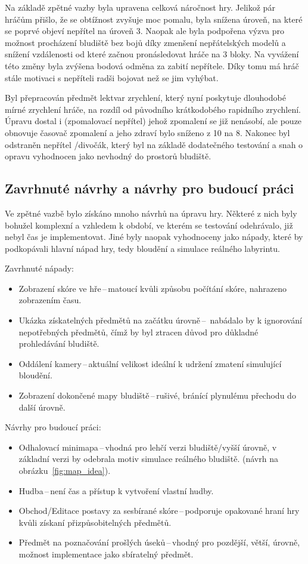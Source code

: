 Na základě zpětné vazby byla upravena celková náročnost hry. Jelikož pár hráčům přišlo, že se obtížnost zvyšuje moc pomalu, byla snížena úroveň, na které se poprvé objeví nepřítel na úroveň 3. Naopak ale byla podpořena výzva pro možnost procházení bludiště bez bojů díky zmenšení nepřátelských modelů a snížení vzdálenosti od které začnou pronásledovat hráče na 3 bloky. Na vyvážení této změny byla zvýšena bodová odměna za zabití nepřítele. Díky tomu má hráč stále motivaci s nepříteli radši bojovat než se jim vyhýbat.

Byl přepracován předmět lektvar zrychlení, který nyní poskytuje dlouhodobé mírné zrychlení hráče, na rozdíl od původního krátkodobého rapidního zrychlení. Úpravu dostal i  (zpomalovací nepřítel) jehož zpomalení se již nenásobí, ale pouze obnovuje časovač zpomalení a jeho zdraví bylo sníženo z 10 na 8. Nakonec byl odstraněn nepřítel /divočák, který byl na základě dodatečného testování a snah o opravu vyhodnocen jako nevhodný do prostorů bludiště.

\subsection*{Zavrhnuté návrhy a návrhy pro budoucí práci}
Ve zpětné vazbě bylo získáno mnoho návrhů na úpravu hry. Některé z nich byly bohužel komplexní a vzhledem k období, ve kterém se testování odehrávalo, již nebyl čas je implementovat. Jiné byly naopak vyhodnoceny jako nápady, které by podkopávali hlavní nápad hry, tedy bloudění a simulace reálného labyrintu.

\noindent Zavrhnuté nápady:
\begin{itemize}
    \item Zobrazení skóre ve hře\,--\,matoucí kvůli způsobu počítání skóre, nahrazeno zobrazením času.
    \item  Ukázka získatelných předmětů na začátku úrovně\,--\, nabádalo by k ignorování nepotřebných předmětů, čímž by byl ztracen důvod pro důkladné prohledávání bludiště.
    \item  Oddálení kamery\,--\,aktuální velikost ideální k udržení zmatení simulující bloudění.
    \item Zobrazení dokončené mapy bludiště\,--\,rušivé, bránící plynulému přechodu do další úrovně.
\end{itemize}

\noindent Návrhy pro budoucí práci:
\begin{itemize}
    \item Odhalovací minimapa\,--\,vhodná pro lehčí verzi bludiště/vyšší úrovně, v základní verzi by odebrala motiv simulace reálného bludiště.
    (návrh na obrázku~\ref{fig:map_idea}).
    \item Hudba\,--\,není čas a přístup k vytvoření vlastní hudby.
    \item Obchod/Editace postavy za sesbírané skóre\,--\,podporuje opakované hraní hry kvůli získaní přizpůsobitelných předmětů.
    \item  Předmět na poznačování prošlých úseků\,--\,vhodný pro pozdější, větší, úrovně, možnost implementace jako sbíratelný předmět.
\end{itemize}

